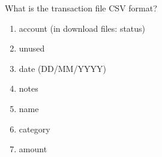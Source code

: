 \documentclass[12pt,letterpaper]{article}
\begin{document}
\begin{framed}
    \begin{minipage}[t][3in][t]{5in}
        \Large
        What is the transaction file CSV format?\\
        \normalsize
        \begin{enumerate}
            \item account (in download files: status)
            \item unused
            \item date (DD/MM/YYYY)
            \item notes
            \item name
            \item category
            \item amount
        \end{enumerate}
    \end{minipage}
\end{framed}
\end{document}
